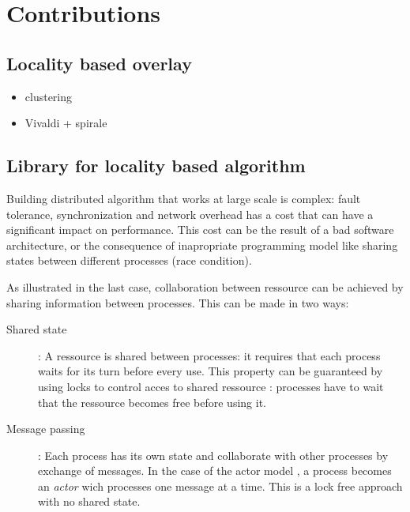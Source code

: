 \section{Contributions}


\subsection{Locality based overlay}

\begin{itemize}
	
	\item clustering
	
	\item Vivaldi + spirale

\end{itemize}

\subsection{Library for locality based algorithm}

Building distributed algorithm that works at large scale is complex: fault
tolerance, synchronization and network overhead has a cost that can have a
significant impact on performance. This cost can be the result of a bad software
architecture, or the consequence of inapropriate programming model like sharing
states between different processes (race condition).

As illustrated in the last case, collaboration between ressource can be achieved
by sharing information between processes. This can be made in two ways:

\begin{description}

	\item [Shared state] : A ressource is shared between processes: it
	requires that each process waits for its turn before every use. This 
	property can be guaranteed by using locks to control acces to shared 
	ressource : processes have to wait that the ressource becomes free before
	using it.

	\item [Message passing] : Each process has its own state and collaborate
	with other processes by exchange of messages. In the case of the actor model 
	\cite{Hewitt1973}, a process becomes an \emph{actor} wich processes one
	message at a time. This is a lock free approach with no	shared state.

\end{description}

